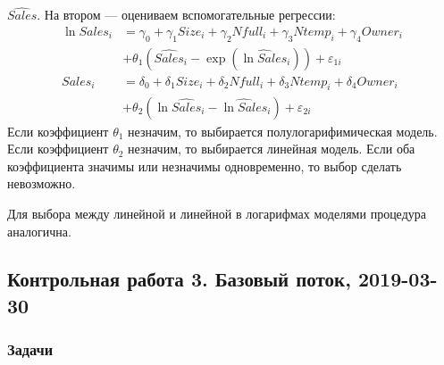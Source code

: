 \begin{enumerate}
\begin{enumerate}
  $\widehat{Sales}$. На втором — оцениваем вспомогательные регрессии:
  \begin{align*}
    \ln Sales_i &= \gamma_0 + \gamma_1 Size_i + \gamma_2 Nfull_i +
    \gamma_3 Ntemp_i + \gamma_4 Owner_i \\
    &+ \theta_1 (\widehat{Sales}_i - \exp(\widehat{\ln Sales}_i)) +
    \varepsilon_{1i} \\
    Sales_i &= \delta_0 + \delta_1 Size_i + \delta_2 Nfull_i +
    \delta_3 Ntemp_i + \delta_4 Owner_i \\
    &+ \theta_2 (\ln \widehat{Sales}_i -\widehat{\ln Sales}_i) +
    \varepsilon_{2i}
  \end{align*}
  Если коэффициент $\theta_1$ незначим, то выбирается полулогарифимическая модель.
  Если коэффициент $\theta_2$ незначим, то выбирается линейная модель.
  Если оба коэффициента значимы или незначимы одновременно, то выбор сделать невозможно.

  Для выбора между линейной и линейной в логарифмах моделями процедура аналогична.
\end{enumerate}
\end{enumerate}


\subsection{Контрольная работа 3. Базовый поток, 2019-03-30}














\subsubsection*{Задачи}


